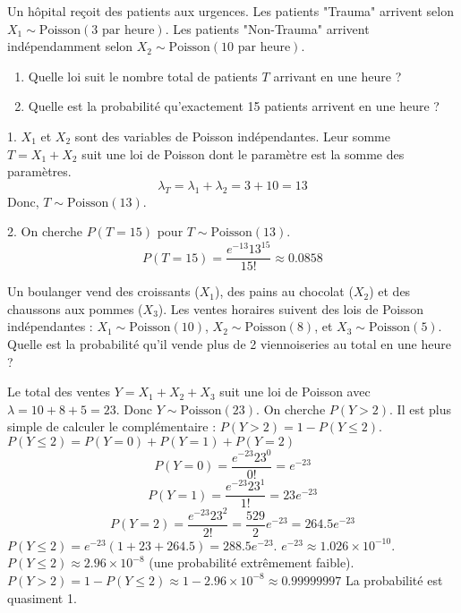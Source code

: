 \begin{exercicebox}
Un hôpital reçoit des patients aux urgences. Les patients "Trauma" arrivent selon $X_1 \sim \text{Poisson}(3 \text{ par heure})$. Les patients "Non-Trauma" arrivent indépendamment selon $X_2 \sim \text{Poisson}(10 \text{ par heure})$.
\begin{enumerate}
    \item Quelle loi suit le nombre total de patients $T$ arrivant en une heure ?
    \item Quelle est la probabilité qu'exactement 15 patients arrivent en une heure ?
\end{enumerate}
\end{exercicebox}

\begin{correctionbox}
1. $X_1$ et $X_2$ sont des variables de Poisson indépendantes. Leur somme $T = X_1 + X_2$ suit une loi de Poisson dont le paramètre est la somme des paramètres.
$$\lambda_T = \lambda_1 + \lambda_2 = 3 + 10 = 13$$
Donc, $T \sim \text{Poisson}(13)$.

2. On cherche $P(T=15)$ pour $T \sim \text{Poisson}(13)$.
$$P(T=15) = \frac{e^{-13} 13^{15}}{15!} \approx 0.0858$$
\end{correctionbox}

\begin{exercicebox}
Un boulanger vend des croissants ($X_1$), des pains au chocolat ($X_2$) et des chaussons aux pommes ($X_3$). Les ventes horaires suivent des lois de Poisson indépendantes : $X_1 \sim \text{Poisson}(10)$, $X_2 \sim \text{Poisson}(8)$, et $X_3 \sim \text{Poisson}(5)$.
Quelle est la probabilité qu'il vende plus de 2 viennoiseries au total en une heure ?
\end{exercicebox}

\begin{correctionbox}
Le total des ventes $Y = X_1 + X_2 + X_3$ suit une loi de Poisson avec $\lambda = 10+8+5=23$. Donc $Y \sim \text{Poisson}(23)$.
On cherche $P(Y > 2)$. Il est plus simple de calculer le complémentaire : $P(Y > 2) = 1 - P(Y \le 2)$.
$P(Y \le 2) = P(Y=0) + P(Y=1) + P(Y=2)$
$$P(Y=0) = \frac{e^{-23} 23^0}{0!} = e^{-23}$$
$$P(Y=1) = \frac{e^{-23} 23^1}{1!} = 23 e^{-23}$$
$$P(Y=2) = \frac{e^{-23} 23^2}{2!} = \frac{529}{2} e^{-23} = 264.5 e^{-23}$$
$P(Y \le 2) = e^{-23} (1 + 23 + 264.5) = 288.5 e^{-23}$.
$e^{-23} \approx 1.026 \times 10^{-10}$.
$P(Y \le 2) \approx 2.96 \times 10^{-8}$ (une probabilité extrêmement faible).
$P(Y > 2) = 1 - P(Y \le 2) \approx 1 - 2.96 \times 10^{-8} \approx 0.99999997$
La probabilité est quasiment 1.
\end{correctionbox}

